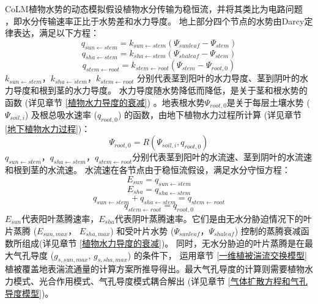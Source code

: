 CoLM植物水势的动态模拟假设植物水分传输为稳恒流，并将其类比为电路问题 
\citep{van1948water}，即水分传输速率正比于水势差和水力导度。
地上部分四个节点的水势由Darcy定律表达，满足以下方程：
\begin{equation}\label{q_sunstem}
q_{ {sun \leftarrow stem }}=k_{{sun} \leftarrow  {stem}}\left(\Psi_{sunleaf}-\Psi_{stem}\right)
\end{equation}
\begin{equation}
q_{ {sha \leftarrow stem }}=k_{ {sha} \leftarrow {stem}}\left(\Psi_{shaleaf}-\Psi_{ {stem }}\right)
\end{equation}
\begin{equation}
q_{ {stem \leftarrow root }}=k_{ {stem } \leftarrow  { root }}\left(\Psi_{ {stem }}-\Psi_{ {root }, 0}\right)
\end{equation}
$k_{sun \leftarrow stem}$，$k_{sha \leftarrow stem }$，$k_{stem \leftarrow root }$ 分别代表茎到阳叶的水力导度、茎到阴叶的水力导度和根到茎的水力导度。
水力导度随水势降低而降低，是关于茎和根水势的函数 (详见章节 \ref{植物水力导度的衰减}) 。地表根水势$\Psi_{root,0}$是关于每层土壤水势 ($\Psi_{soil,i}$) 
及根总吸水速率 ($q_{root,0}$) 的函数，由地下植物水力过程所计算 (详见章节 \ref{地下植物水力过程})：
\begin{equation}\label{Psi_root_0}
\Psi_{root, 0}=R\left(\Psi_{ {soil }, i}, q_{root, 0}\right)
\end{equation}
$q_{sun \leftarrow stem}$，$q_{sha \leftarrow stem }$，$q_{stem \leftarrow root }$分别代表茎到阳叶的水流速、茎到阴叶的水流速和根到茎的水流速。
水流速在各节点由于稳恒流假设，满足水分守恒方程：
\begin{equation}
E_{sun}=q_{sun \leftarrow  stem}
\end{equation}
\begin{equation}
E_{ {sha }}=q_{ sha \leftarrow stem}
\end{equation}
\begin{equation}
q_{ {sun \leftarrow stem }}+q_{ {sha \leftarrow stem }}=q_{ {stem \leftarrow root }}
\end{equation}
\begin{equation}\label{q_stemroot}
q_{stem \leftarrow root}=q_{root, 0}
\end{equation}
$E_{sun}$代表阳叶蒸腾速率，$E_{sha}$代表阴叶蒸腾速率。它们是由无水分胁迫情况下的叶片蒸腾 ($E_{sun,max}$， $E_{sha,max}$) 
和受叶片水势 ($\Psi_{sunleaf}$，$\Psi_{shaleaf}$) 控制的蒸腾衰减函数所组成(详见章节 \ref{植物水力导度的衰减})。
同时，无水分胁迫的叶片蒸腾是在最大气孔导度 ($g_{s,sun,max}$, $g_{s,sha,max}$) 的条件下，
运用章节 \ref{一维植被湍流交换模型} 植被覆盖地表湍流通量的计算方案所推导得出。最大气孔导度的计算则需要植物水力模式、光合作用模式、气孔导度模式耦合解出 (详见章节 \ref{气体扩散方程和气孔导度模型})。

